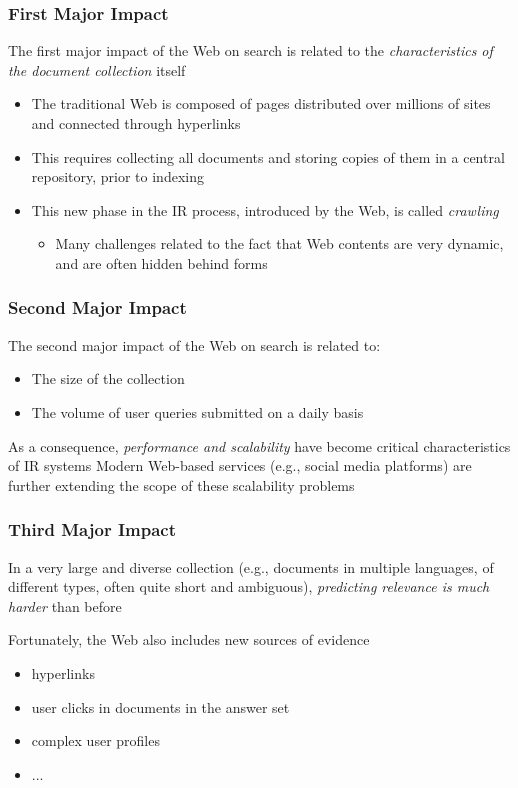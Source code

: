 \documentclass[svgnames]{beamer}
\begin{document}
\begin{frame}
  \frametitle{First Major Impact}

The first major impact of the Web on search is related to the \emph{characteristics of the document collection} itself

\begin{itemize}
\item The traditional Web is composed of pages distributed over millions of sites and connected through hyperlinks
\item This requires collecting all documents and storing copies of them in a central repository, prior to indexing
\item This new phase in the IR process, introduced by the Web, is
  called \emph{crawling}
  \begin{itemize}
  \item Many challenges related to the fact that Web contents are very dynamic, and are often hidden behind forms
  \end{itemize}
\end{itemize}

\end{frame}


\begin{frame}
  \frametitle{Second Major Impact}

The second major impact of the Web on search is related to: 
\begin{itemize}
\item The size of the collection
\item The volume of user queries submitted on a daily basis
\end{itemize}

As a consequence, \emph{performance and scalability} have become critical characteristics of IR systems
\vfill
Modern Web-based services (e.g., social media platforms) are further extending the scope of these scalability problems
\end{frame}

\begin{frame}
  \frametitle{Third Major Impact}

In a very large and diverse collection (e.g., documents in multiple languages, of different types, often quite short and ambiguous), \emph{predicting relevance is much harder} than
before
\vfill

Fortunately, the Web also includes new sources of evidence
\begin{itemize} 
  \item hyperlinks 
  \item user clicks in documents in the answer set
  \item complex user profiles
  \item ...
\end{itemize}
\end{frame}
\end{document}
